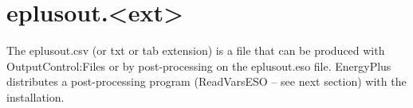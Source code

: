 \section{eplusout.\textless{}ext\textgreater{}}\label{eplusout.ext}

The eplusout.csv (or txt or tab extension) is a file that can be produced with OutputControl:Files or by post-processing on the eplusout.eso file. EnergyPlus distributes a post-processing program (ReadVarsESO -- see next section) with the installation.
